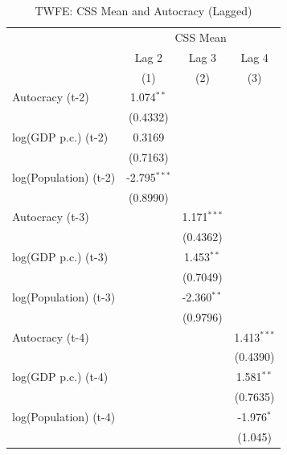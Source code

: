 
\begin{table}[htbp]
   \caption{\label{tab:twfe_autocracy} TWFE: CSS Mean and Autocracy (Lagged)}
   \bigskip
   \centering
   \begin{tabular}{lccc}
      \toprule
       & \multicolumn{3}{c}{CSS Mean}\\
                            & Lag 2          & Lag 3         & Lag 4 \\   
                            & (1)            & (2)           & (3)\\  
      \midrule 
      Autocracy (t-2)       & 1.074$^{**}$   &               &   \\   
                            & (0.4332)       &               &   \\   
      log(GDP p.c.) (t-2)   & 0.3169         &               &   \\   
                            & (0.7163)       &               &   \\   
      log(Population) (t-2) & -2.795$^{***}$ &               &   \\   
                            & (0.8990)       &               &   \\   
      Autocracy (t-3)       &                & 1.171$^{***}$ &   \\   
                            &                & (0.4362)      &   \\   
      log(GDP p.c.) (t-3)   &                & 1.453$^{**}$  &   \\   
                            &                & (0.7049)      &   \\   
      log(Population) (t-3) &                & -2.360$^{**}$ &   \\   
                            &                & (0.9796)      &   \\   
      Autocracy (t-4)       &                &               & 1.413$^{***}$\\   
                            &                &               & (0.4390)\\   
      log(GDP p.c.) (t-4)   &                &               & 1.581$^{**}$\\   
                            &                &               & (0.7635)\\   
      log(Population) (t-4) &                &               & -1.976$^{*}$\\   
                            &                &               & (1.045)\\   

\end{tabular}
\end{table}
